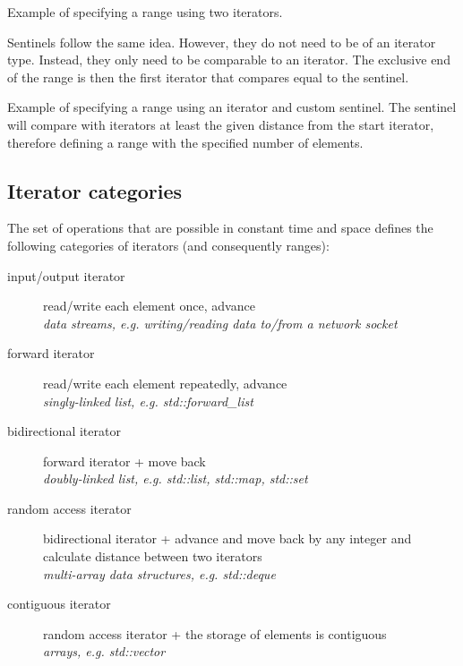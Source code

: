 \begin{box-note}
\footnotesize Example of specifying a range using two iterators.
\tcblower
{}
\end{box-note}

Sentinels follow the same idea. However, they do not need to be of an iterator type. Instead, they only need to be comparable to an iterator. The exclusive end of the range is then the first iterator that compares equal to the sentinel.

\begin{box-note}
\footnotesize Example of specifying a range using an iterator and custom sentinel. The sentinel will compare  with iterators at least the given distance from the start iterator, therefore defining a range with the specified number of elements.
\tcblower
{}
\end{box-note}

\subsection{Iterator categories}

The set of operations that are possible in constant time and space defines the following categories of iterators (and consequently ranges):

\begin{description}
    \item[input/output iterator] read/write each element once, advance\\
    \textit{data streams, e.g. writing/reading data to/from a network socket}
    \item[forward iterator] read/write each element repeatedly, advance\\
    \textit{singly-linked list, e.g. std::forward\_list}
    \item[bidirectional iterator] forward iterator + move back\\
    \textit{doubly-linked list, e.g. std::list, std::map, std::set}
    \item[random access iterator] bidirectional iterator + advance and move back by any integer and calculate distance between two iterators\\
    \textit{multi-array data structures, e.g. std::deque}
    \item[contiguous iterator] random access iterator + the storage of elements is contiguous\\
    \textit{arrays, e.g. std::vector}
\end{description}

